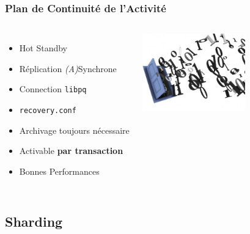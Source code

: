 \documentclass[english]{beamer}
\begin{document}
\begin{frame}[fragile]
  \frametitle{Plan de Continuité de l'Activité}

  \linebreak

\begin{columns}[c]

  \begin{itemize}
   \item<1-> \alert{Hot Standby}
   \item<2-> Réplication \textit{(A)}Synchrone
   \item<2-> Connection \texttt{libpq}
   \item<3-> \texttt{recovery.conf}
   \item<3-> Archivage toujours nécessaire
   \item<3-> Activable \textbf{par transaction}
   \item<4-> Bonnes Performances
  \end{itemize}  

\includegraphics[height=9em]{bits.jpeg}
\end{columns}
\end{frame}


\subsection{Sharding}
\frame{\tableofcontents[currentsubsection]}
\end{document}
